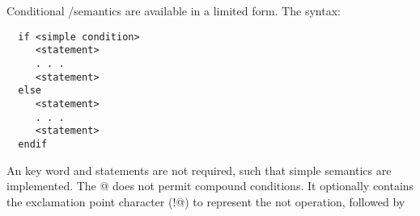 
Conditional \verb@if@/\verb@else@ semantics
are available in a limited form.
The syntax:
\begin{verbatim}
  if <simple condition>
     <statement>
     . . .
     <statement>
  else
     <statement>
     . . .
     <statement>
  endif
\end{verbatim}

An \verb@else@ key word and statements are not required,
such that simple \verb@if@ semantics are implemented.
The  @ does not permit compound conditions.
It optionally contains the exclamation point character (\verb@!@)
to represent the not operation,
followed by 
